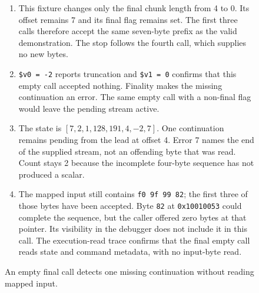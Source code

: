 \begin{figure}[htbp]
  \par\smallskip
  \begin{minipage}{\linewidth}
    \small
    \begin{enumerate}
      \setlength{\itemsep}{2pt}
            \setlength{\parsep}{0pt}
      \item This fixture changes only the final chunk length from 4 to 0. Its offset remains 7 and its final flag remains set. The first three calls therefore accept the same seven-byte prefix as the valid demonstration. The stop follows the fourth call, which supplies no new bytes.
      \item \texttt{\$v0 = -2} reports truncation and \texttt{\$v1 = 0} confirms that this empty call accepted nothing. Finality makes the missing continuation an error. The same empty call with a non-final flag would leave the pending stream active.
      \item The state is $[7,2,1,128,191,4,-2,7]$. One continuation remains pending from the lead at offset 4. Error 7 names the end of the supplied stream, not an offending byte that was read. Count stays 2 because the incomplete four-byte sequence has not produced a scalar.
      \item The mapped input still contains \texttt{f0 9f 99 82}; the first three of those bytes have been accepted. Byte \texttt{82} at \texttt{0x10010053} could complete the sequence, but the caller offered zero bytes at that pointer. Its visibility in the debugger does not include it in this call. The execution-read trace confirms that the final empty call reads state and command metadata, with no input-byte read.
    \end{enumerate}
  \end{minipage}
  \caption{An empty final call detects one missing continuation without reading mapped input.}
  \label{capture:015-utf8-scanner-f04-truncated}
  \label{utf8-f04-truncated}
\end{figure}
\par

